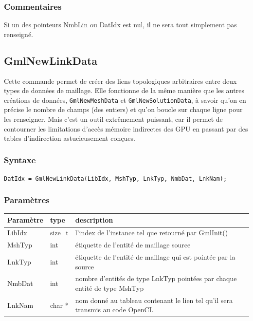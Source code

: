 \documentclass[a4paper,12pt]{article}
\begin{document}
\subsubsection*{Commentaires}

Si un des pointeurs NmbLin ou DatIdx est nul, il ne sera tout simplement pas renseigné.


\subsection{GmlNewLinkData}

Cette commande permet de créer des liens topologiques arbitraires entre deux types de données de maillage.
Elle fonctionne de la même manière que les autres créations de données, {\tt GmlNewMeshData} et {\tt GmlNewSolutionData}, à savoir qu'on en précise le nombre de champs (des entiers) et qu'on boucle sur chaque ligne pour les renseigner.
Mais c'est un outil extrêmement puissant, car il permet de contourner les limitations d'accès mémoire indirectes des GPU en passant par des tables d'indirection astucieusement conçues.

\subsubsection*{Syntaxe}

{\tt DatIdx = GmlNewLinkData(LibIdx, MshTyp, LnkTyp, NmbDat, LnkNam);}

\subsubsection*{Paramètres}

\begin{tabular}{|m{2cm}|m{1.5cm}|m{10.5cm}|}
\hline
Paramètre  & type    & description \\
\hline
LibIdx     & size\_t & l'index de l'instance tel que retourné par GmlInit() \\
\hline
MshTyp     & int     & étiquette de l'entité de maillage source \\
\hline
LnkTyp     & int     & étiquette de l'entité de maillage qui est pointée par la source \\
\hline
NmbDat     & int     & nombre d'entités de type LnkTyp pointées par chaque entité de type MshTyp \\
\hline
LnkNam     & char *  & nom donné au tableau contenant le lien tel qu'il sera transmis au code OpenCL  \\
\hline
\end{tabular}
\end{document}
